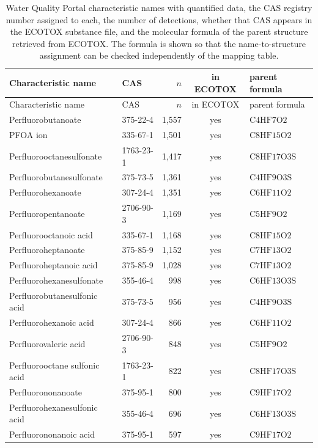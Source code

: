 \begin{longtable}{@{}p{66mm} l r c l@{}}
\caption{Water Quality Portal characteristic names with quantified data, the CAS registry number assigned to each, the number of detections, whether that CAS appears in the ECOTOX substance file, and the molecular formula of the parent structure retrieved from ECOTOX. The formula is shown so that the name-to-structure assignment can be checked independently of the mapping table.}\label{tab:s1}\\
\toprule
Characteristic name & CAS & $n$ & in ECOTOX & parent formula \\
\midrule
\endfirsthead
\toprule
Characteristic name & CAS & $n$ & in ECOTOX & parent formula \\
\midrule
\endhead
Perfluorobutanoate & 375-22-4 & 1,557 & yes & $\mathrm{C4HF7O2}$ \\
PFOA ion & 335-67-1 & 1,501 & yes & $\mathrm{C8HF15O2}$ \\
Perfluorooctanesulfonate & 1763-23-1 & 1,417 & yes & $\mathrm{C8HF17O3S}$ \\
Perfluorobutanesulfonate & 375-73-5 & 1,361 & yes & $\mathrm{C4HF9O3S}$ \\
Perfluorohexanoate & 307-24-4 & 1,351 & yes & $\mathrm{C6HF11O2}$ \\
Perfluoropentanoate & 2706-90-3 & 1,169 & yes & $\mathrm{C5HF9O2}$ \\
Perfluorooctanoic acid & 335-67-1 & 1,168 & yes & $\mathrm{C8HF15O2}$ \\
Perfluoroheptanoate & 375-85-9 & 1,152 & yes & $\mathrm{C7HF13O2}$ \\
Perfluoroheptanoic acid & 375-85-9 & 1,028 & yes & $\mathrm{C7HF13O2}$ \\
Perfluorohexanesulfonate & 355-46-4 & 998 & yes & $\mathrm{C6HF13O3S}$ \\
Perfluorobutanesulfonic acid & 375-73-5 & 956 & yes & $\mathrm{C4HF9O3S}$ \\
Perfluorohexanoic acid & 307-24-4 & 866 & yes & $\mathrm{C6HF11O2}$ \\
Perfluorovaleric acid & 2706-90-3 & 848 & yes & $\mathrm{C5HF9O2}$ \\
Perfluorooctane sulfonic acid & 1763-23-1 & 822 & yes & $\mathrm{C8HF17O3S}$ \\
Perfluorononanoate & 375-95-1 & 800 & yes & $\mathrm{C9HF17O2}$ \\
Perfluorohexanesulfonic acid & 355-46-4 & 696 & yes & $\mathrm{C6HF13O3S}$ \\
Perfluorononanoic acid & 375-95-1 & 597 & yes & $\mathrm{C9HF17O2}$ \\

\end{longtable}
